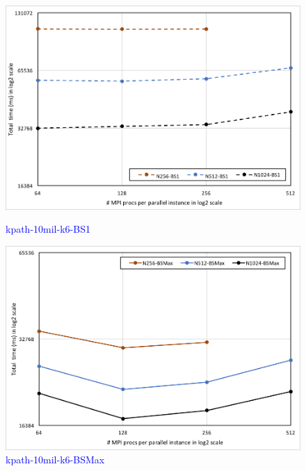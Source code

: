 \begin{figure}[!htb]
    \begin{minipage}{0.23\textwidth}
        \centering
        \includegraphics[width=1\columnwidth]{img/kpath-N1N/10mil-k6-BS1.png}
        \caption{\textcolor{blue}{kpath-10mil-k6-BS1}}
        \label{fig:fig-kpath-10mil-k6-BS1.png}
    \end{minipage}   
    \hspace{0mm}
    \begin{minipage}{0.23\textwidth}
        \centering
        \includegraphics[width=1\columnwidth]{img/kpath-N1N/10mil-k6-BSMax.png}
        \caption{\textcolor{blue}{kpath-10mil-k6-BSMax}}
        \label{fig:fig-kpath-10mil-k6-BSMax.png}
    \end{minipage}   
    \hspace{0mm}
    \begin{minipage}{0.23\textwidth}

\end{minipage}
\end{figure}

